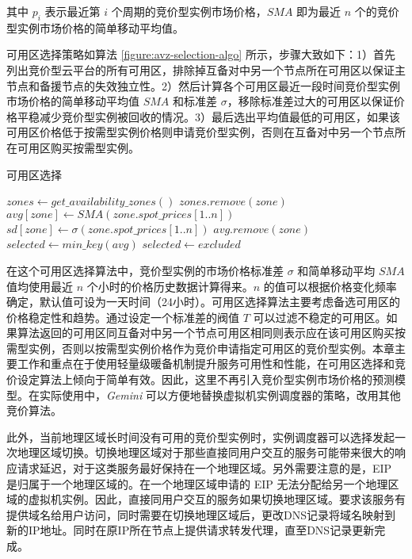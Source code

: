 其中 $p_i$ 表示最近第 $i$ 个周期的竞价型实例市场价格，$SMA$ 即为最近 $n$ 个的竞价型实例市场价格的简单移动平均值。

可用区选择策略如算法 \ref{figure:avz-selection-algo} 所示，步骤大致如下：1）首先列出竞价型云平台的所有可用区，排除掉互备对中另一个节点所在可用区以保证主节点和备援节点的失效独立性。2）然后计算各个可用区最近一段时间竞价型实例市场价格的简单移动平均值 $SMA$ 和标准差 $\sigma$，移除标准差过大的可用区以保证价格平稳减少竞价型实例被回收的情况。3）最后选出平均值最低的可用区，如果该可用区价格低于按需型实例价格则申请竞价型实例，否则在互备对中另一个节点所在可用区购买按需型实例。
\begin{algorithm}
\caption{可用区选择}
\label{figure:avz-selection-algo}
$zones\gets get\_availability\_zones()$
{
  {
    $zones.remove(zone)$\;
  }
}
{
  $avg[zone]\gets SMA(zone.spot\_prices[1..n])$
  $sd[zone]\gets \sigma(zone.spot\_prices[1..n])$
}
{
  {
    $avg.remove(zone)$\;
  }
}
$selected\gets min\_key(avg)$\;
{
  $selected\gets excluded$\;
}
\;
\end{algorithm}

在这个可用区选择算法中，竞价型实例的市场价格标准差 $\sigma$ 和简单移动平均 $SMA$ 值均使用最近 $n$ 个小时的价格历史数据计算得来。$n$ 的值可以根据价格变化频率确定，默认值可设为一天时间（24小时）。可用区选择算法主要考虑备选可用区的价格稳定性和趋势。通过设定一个标准差的阀值 $T$ 可以过滤不稳定的可用区。如果算法返回的可用区同互备对中另一个节点可用区相同则表示应在该可用区购买按需型实例，否则以按需型实例价格作为竞价申请指定可用区的竞价型实例。本章主要工作和重点在于使用轻量级暖备机制提升服务可用性和性能，在可用区选择和竞价设定算法上倾向于简单有效。因此，这里不再引入竞价型实例市场价格的预测模型。在实际使用中，\emph{Gemini} 可以方便地替换虚拟机实例调度器的策略，改用其他竞价算法。

此外，当前地理区域长时间没有可用的竞价型实例时，实例调度器可以选择发起一次地理区域切换。切换地理区域对于那些直接同用户交互的服务可能带来很大的响应请求延迟，对于这类服务最好保持在一个地理区域。另外需要注意的是，EIP 是归属于一个地理区域的。在一个地理区域申请的 EIP 无法分配给另一个地理区域的虚拟机实例。因此，直接同用户交互的服务如果切换地理区域。要求该服务有提供域名给用户访问，同时需要在切换地理区域后，更改DNS记录将域名映射到新的IP地址。同时在原IP所在节点上提供请求转发代理，直至DNS记录更新完成。


